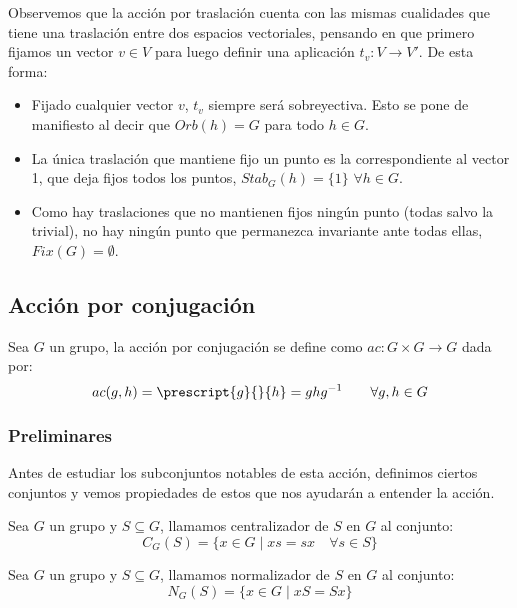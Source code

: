 \begin{observacion}
    Observemos que la acción por traslación cuenta con las mismas cualidades que tiene una traslación entre dos espacios vectoriales, pensando en que primero fijamos un vector $v\in V$ para luego definir una aplicación $t_v:V\to V'$. De esta forma:
    \begin{itemize}
        \item Fijado cualquier vector $v$, $t_v$ siempre será sobreyectiva. Esto se pone de manifiesto al decir que $Orb(h) = G$ para todo $h\in G$.
        \item La única traslación que mantiene fijo un punto es la correspondiente al vector 1, que deja fijos todos los puntos, $Stab_G(h) = \{1\}$ $\forall h\in G$.
        \item Como hay traslaciones que no mantienen fijos ningún punto (todas salvo la trivial), no hay ningún punto que permanezca invariante ante todas ellas, $Fix(G) = \emptyset $.
    \end{itemize}
\end{observacion}

\subsection{Acción por conjugación}
\noindent
Sea $G$ un grupo, la acción por conjugación se define como $ac:G\times G\to G$ dada por:
\begin{equation*}
    ac(g,h) = \prescript{g}{}{h} = ghg^{-1} \qquad \forall g,h\in G
\end{equation*}

\subsubsection{Preliminares}
\noindent
Antes de estudiar los subconjuntos notables de esta acción, definimos ciertos conjuntos y vemos propiedades de estos que nos ayudarán a entender la acción.

\begin{definicion}[Centralizador]
    Sea $G$ un grupo y $S\subseteq G$, llamamos centralizador de $S$ en $G$ al conjunto:
    \begin{equation*}
        C_G(S) = \{x\in G \mid xs = sx \quad \forall s\in S\}
    \end{equation*}
\end{definicion}

\begin{definicion}[Normalizador]
    Sea $G$ un grupo y $S\subseteq G$, llamamos normalizador de $S$ en $G$ al conjunto:
    \begin{equation*}
        N_G(S) = \{x\in G \mid xS = Sx\}
    \end{equation*}
\end{definicion}

